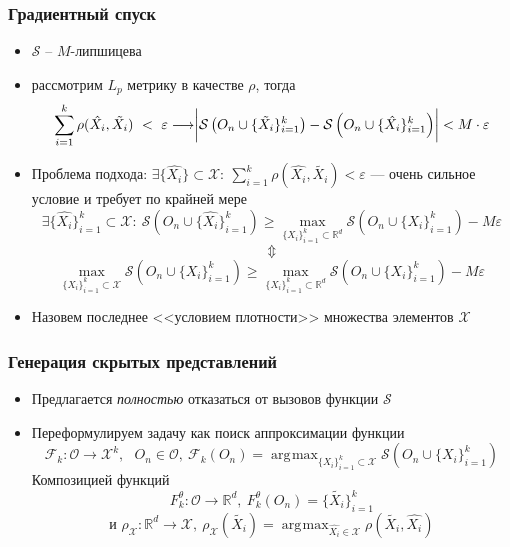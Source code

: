 \documentclass[10pt]{beamer}
\DeclareMathOperator*{\argmax}{\arg\!\max}
\begin{document}
\begin{frame}
	\frametitle{Градиентный спуск}
		\begin{itemize}
			\item $\mathcal{S}$ -- $M$-липшицева
			\item рассмотрим $L_p$ метрику в качестве $\rho$, тогда
			$$\sum_{i=1}^k\rho(\hat{X_i}, \tilde{X_i})~<~\varepsilon\longrightarrow \biggr{|}\mathcal{S}\left(O_n\cup\{\tilde{X_i}\}_{i=1}^k\right) - \mathcal{S}\left(O_n\cup\{\hat{X_i}\}_{i=1}^k\right)\biggr{|} < M\cdot\varepsilon$$
			
			\item Проблема подхода: $\exists\{\hat{X_i}\}\subset \mathcal{X}:~ \sum\limits_{i=1}^k\rho(\hat{X_i}, \tilde{X_i}) < \varepsilon$ --- очень сильное условие и требует по крайней мере
			$$\exists \{\hat{X_i}\}_{i=1}^k\subset\mathcal{X}:~ \mathcal{S}\left(O_n\cup\{\hat{X_i}\}_{i=1}^k\right) \geqslant \max_{\{X_i\}_{i=1}^k\subset\mathbb{R}^d} \mathcal{S}\left(O_n\cup\{X_i\}_{i=1}^k\right) - M\varepsilon$$
			$$\Updownarrow$$
			$$\max_{\{X_i\}_{i=1}^k\subset\mathcal{X}} \mathcal{S}\left(O_n\cup\{X_i\}_{i=1}^k\right) \geqslant \max_{\{X_i\}_{i=1}^k\subset\mathbb{R}^d} \mathcal{S}\left(O_n\cup\{X_i\}_{i=1}^k\right) - M\varepsilon$$
			\item Назовем последнее <<условием плотности>> множества элементов $\mathcal{X}$
		\end{itemize}
\end{frame}

\begin{frame}
	\frametitle{Генерация скрытых представлений}
		\begin{itemize}
			\item Предлагается \textit{полностью} отказаться от вызовов функции $\mathcal{S}$
			\item Переформулируем задачу как поиск аппроксимации функции 
			$$\mathcal{F}_k: \mathcal{O}\longrightarrow \mathcal{X}^k, ~~~O_n\in \mathcal{O},~ \mathcal{F}_k(O_n) = \argmax_{\{X_i\}_{i=1}^k\subset\mathcal{X}} \mathcal{S}\left(O_n\cup\{X_i\}_{i=1}^k\right)$$
			Композицией функций 
			$$F_k^\theta: \mathcal{O}\longrightarrow \mathbb{R}^d, ~F_k^\theta(O_n) = \{\tilde{X_i}\}_{i=1}^k$$
			$$\text{и }\rho_\mathcal{X}: \mathbb{R}^d\longrightarrow \mathcal{X}, ~ \rho_\mathcal{X}(\tilde{X_i}) = \argmax_{\hat{X_i}\in\mathcal{X}}\rho(\tilde{X_i}, \hat{X_i})$$
		\end{itemize}
\end{frame}
\end{document}

